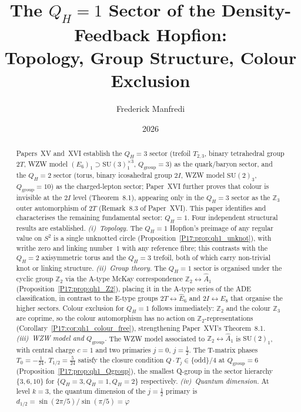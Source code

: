\documentclass[11pt,a4paper]{article}
\title{\textbf{The $Q_H=1$ Sector of the Density-Feedback Hopfion:\\
Topology, Group Structure, Colour Exclusion}}
\author{Frederick Manfredi}
\date{2026}
\theoremstyle{definition}\newtheorem{definition}[theorem]{Definition}
\theoremstyle{remark}
\newcommand{\vp}{\varphi}
\newcommand{\SU}{\mathrm{SU}}
\newcommand{\twoI}{2I}
\newcommand{\twoT}{2T}
\newcommand{\QH}{Q_H}
\newcommand{\Ztwo}{\mathbb{Z}_2}
\newcommand{\Zthree}{\mathbb{Z}_3}
\newcommand{\dimq}[1]{d_{#1}}
\begin{document}
\maketitle

\begin{abstract}
Papers~XV and~XVI establish the $\QH=3$ sector (trefoil $T_{2,3}$,
binary tetrahedral group $\twoT$, WZW model $(E_6)_1\supset\SU(3)_1^{\times
3}$, $Q_{\mathrm{group}}=3$) as the quark/baryon sector, and the $\QH=2$
sector (torus, binary icosahedral group $\twoI$, WZW model $\SU(2)_3$,
$Q_{\mathrm{group}}=10$) as the charged-lepton sector; Paper~XVI further
proves that colour is invisible at the $\twoI$ level
(Theorem~8.1), %
appearing only in the $\QH=3$ sector
as the $\Zthree$ outer automorphism of $\twoT$
(Remark~8.3 %
of Paper~XVI). This paper
identifies and characterises the remaining fundamental sector:
$\QH=1$. Four independent structural results are established.
\emph{(i)~Topology.} The $\QH=1$ Hopfion's preimage of any regular
value on $S^2$ is a single unknotted circle (Proposition~\ref{P17:prop:qh1_unknot}),
with writhe zero and linking number~$1$ with any reference fibre;
this contrasts with the $\QH=2$ axisymmetric torus and the $\QH=3$
trefoil, both of which carry non-trivial knot or linking structure.
\emph{(ii)~Group theory.} The $\QH=1$ sector is organised under the
cyclic group $\Ztwo$ via the A-type McKay correspondence
$\Ztwo\leftrightarrow\widehat{A}_1$ (Proposition~\ref{P17:prop:qh1_Z2}),
placing it in the A-type series of the ADE classification, in contrast
to the E-type groups $\twoT\leftrightarrow\widehat{E}_6$ and
$\twoI\leftrightarrow\widehat{E}_8$ that organise the higher sectors.
Colour exclusion for $\QH=1$ follows immediately: $\Ztwo$ and the colour
$\Zthree$ are coprime, so the colour automorphism has no action on
$\Ztwo$-representations (Corollary~\ref{P17:cor:qh1_colour_free}),
strengthening Paper~XVI's Theorem~8.1.%
\emph{(iii)~WZW model and $Q_{\mathrm{group}}$.} The WZW model
associated to $\Ztwo\leftrightarrow\widehat{A}_1$ is $\SU(2)_1$, with
central charge $c=1$ and two primaries $j=0$, $j=\tfrac12$. The
T-matrix phases $T_0=-\tfrac{1}{24}$, $T_{1/2}=\tfrac{5}{24}$
satisfy the closure condition $Q\cdot T_j\in\{$odd$\}/4$ at
$Q_{\mathrm{group}}=6$ (Proposition~\ref{P17:prop:qh1_Qgroup}), the
smallest Q-group in the sector hierarchy $\{3,6,10\}$ for
$\{\QH=3,\QH=1,\QH=2\}$ respectively.
\emph{(iv)~Quantum dimension.} At level $k=3$, the quantum dimension of
the $j=\tfrac12$ primary is $\dimq{1/2}=\sin(2\pi/5)/\sin(\pi/5)=\vp$

\end{abstract}
\end{document}
